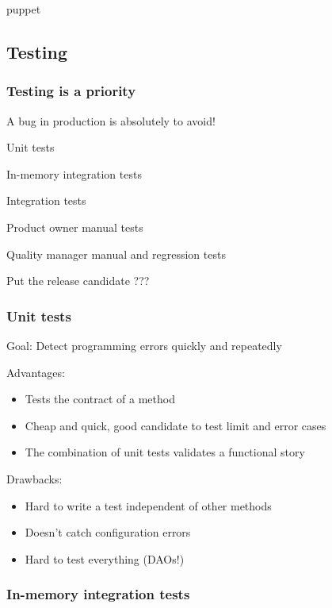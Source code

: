 \documentclass[a4paper, 11pt]{article}
\begin{document}
    puppet

    \subsection{Testing}

    \subsubsection{Testing is a priority}

    A bug in production is absolutely to avoid!

    Unit tests

    In-memory integration tests

    Integration tests

    Product owner manual tests

    Quality manager manual and regression tests

    Put the release candidate ???

    \subsubsection{Unit tests}

    Goal: Detect programming errors quickly and repeatedly

    Advantages:

    \begin{itemize}
        \item Tests the contract of a method
        \item Cheap and quick, good candidate to test limit and error cases
        \item The combination of unit tests validates a functional story
    \end{itemize}

    Drawbacks:
    \begin{itemize}
        \item Hard to write a test independent of other methods
        \item Doesn't catch configuration errors
        \item Hard to test everything (DAOs!)
    \end{itemize}

    \subsubsection{In-memory integration tests}
\end{document}
